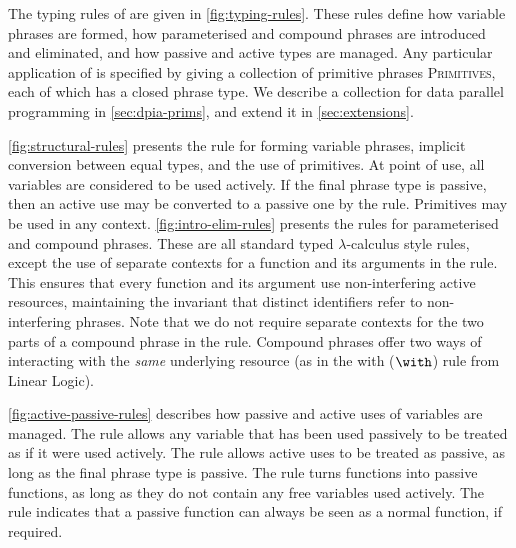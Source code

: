 The typing rules of \DPIA are given in \autoref{fig:typing-rules}. These rules define how variable phrases are formed, how parameterised and compound phrases are introduced and eliminated, and how passive and active types are managed. Any particular application of \DPIA is specified by giving a collection of primitive phrases \textsc{Primitives}, each of which has a closed phrase type. We describe a collection for data parallel programming in \autoref{sec:dpia-prims}, and extend it in \autoref{sec:extensions}.

\autoref{fig:structural-rules} presents the rule for forming variable phrases, implicit conversion between equal types, and the use of primitives. At point of use, all variables are considered to be used actively. If the final phrase type is passive, then an active use may be converted to a passive one by the  rule. Primitives may be used in any context. \autoref{fig:intro-elim-rules} presents the rules for parameterised and compound phrases. These are all standard typed $\lambda$-calculus style rules, except the use of separate contexts for a function and its arguments in the  rule. This ensures that every function and its argument use non-interfering active resources, maintaining the invariant that distinct identifiers refer to non-interfering phrases. Note that we do not require separate contexts for the two parts of a compound phrase in the  rule. Compound phrases offer two ways of interacting with the \emph{same} underlying resource (as in the with ($\with$) rule from Linear Logic).

\autoref{fig:active-passive-rules} describes how passive and active uses of variables are managed. The  rule allows any variable that has been used passively to be treated as if it were used actively. The  rule allows active uses to be treated as passive, as long as the final phrase type is passive. The  rule turns functions into passive functions, as long as they do not contain any free variables used actively. The  rule indicates that a passive function can always be seen as a normal function, if required.


